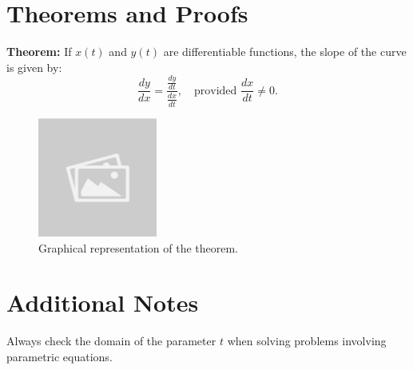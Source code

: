 \documentclass{article}
\begin{document}
\section*{Theorems and Proofs}
\begin{theorembox}
\textbf{Theorem:} If $x(t)$ and $y(t)$ are differentiable functions, the slope of the curve is given by:
\[ \frac{dy}{dx} = \frac{\frac{dy}{dt}}{\frac{dx}{dt}}, \quad \text{provided } \frac{dx}{dt} \neq 0. \]

\begin{figure}[H]
    \centering
    \includegraphics[width=0.35\textwidth]{sample_image1.jpg}
    \caption{Graphical representation of the theorem.}
    \label{fig:sample_image1}
\end{figure}

\end{theorembox}

\section*{Additional Notes}
\begin{notebox}
Always check the domain of the parameter $t$ when solving problems involving parametric equations.
\end{notebox}
\end{document}
